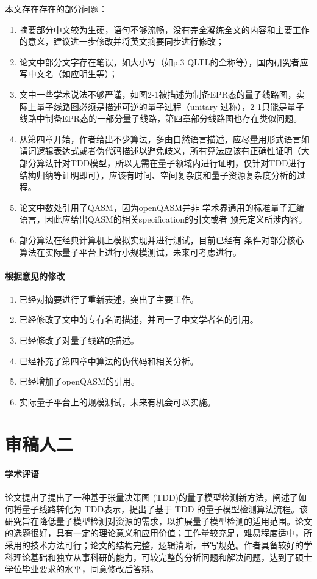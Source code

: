 \documentclass{article} %
\begin{document}
本文存在存在的部分问题：
\begin{enumerate}
    \item 摘要部分中文较为生硬，语句不够流畅，没有完全凝练全文的内容和主要工作的意义，建议进一步修改并将英文摘要同步进行修改；
    \item 论文中部分文字存在笔误，如大小写（如p.3 QLTL的全称等），国内研究者应写中文名（如应明生等）；
    \item 文中一些学术说法不够严谨，如图2-1被描述为制备EPR态的量子线路图，实际上量子线路图必须是描述可逆的量子过程（unitary 过称），2-1只能是量子线路中制备EPR态的一部分量子线路，第四章部分线路图也存在类似问题。
    \item 从第四章开始，作者给出不少算法，多由自然语言描述，应尽量用形式语言如谓词逻辑表达式或者伪代码描述以避免歧义，所有算法应该有正确性证明（大部分算法针对TDD模型，所以无需在量子领域内进行证明，仅针对TDD进行结构归纳等证明即可），应该有时间、空间复杂度和量子资源复杂度分析的过程。
    \item 论文中数处引用了QASM，因为openQASM并非
    学术界通用的标准量子汇编语言，因此应给出QASM的相关specification的引文或者
    预先定义所涉内容。
    \item 部分算法在经典计算机上模拟实现并进行测试，目前已经有
    条件对部分核心算法在实际量子平台上进行小规模测试，未来可考虑进行。
\end{enumerate}
\paragraph{根据意见的修改}
\begin{enumerate}
    \item 已经对摘要进行了重新表述，突出了主要工作。
    \item 已经修改了文中的专有名词描述，并同一了中文学者名的引用。
    \item 已经修改了对量子线路的描述。
    \item 已经补充了第四章中算法的伪代码和相关分析。
    \item 已经增加了openQASM的引用。
    \item 实际量子平台上的规模测试，未来有机会可以实施。
\end{enumerate}
\section*{审稿人二}
\paragraph{学术评语}
论文提出了提出了一种基于张量决策图 (TDD)的量子模型检测新方法，阐述了如何将量子线路转化为 TDD表示，提出了基于 TDD 的量子模型检测算法流程。该研究旨在降低量子模型检测对资源的需求，以扩展量子模型检测的适用范围。论文的选题很好，具有一定的理论意义和应用价值；工作量较充足，难易程度适中，所采用的技术方法可行；论文的结构完整，逻辑清晰，书写规范。作者具备较好的学科理论基础和独立从事科研的能力，可较完整的分析问题和解决问题，达到了硕士学位毕业要求的水平，同意修改后答辩。
\end{document}
